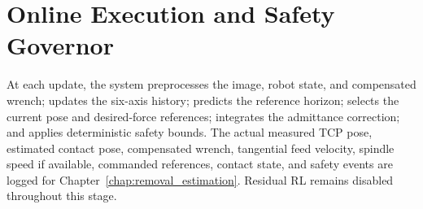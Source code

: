 \section{Online Execution and Safety Governor}
At each update, the system preprocesses the image, robot state, and compensated wrench; updates the six-axis history; predicts the reference horizon; selects the current pose and desired-force references; integrates the admittance correction; and applies deterministic safety bounds. The actual measured TCP pose, estimated contact pose, compensated wrench, tangential feed velocity, spindle speed if available, commanded references, contact state, and safety events are logged for Chapter~\ref{chap:removal_estimation}. Residual RL remains disabled throughout this stage.
